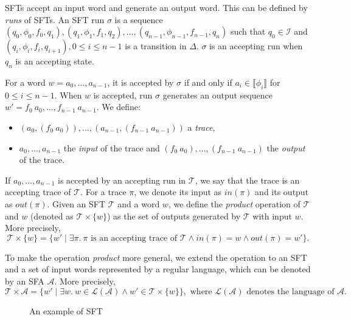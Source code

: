 \documentclass[a4paper,UKenglish,cleveref, autoref, thm-restate]{lipics-v2021}
\begin{document}
SFTs accept an input word and generate an output word. This can be defined by \emph{runs} of SFTs.
An SFT run $\sigma$ is a sequence $(q_0, \phi_0, f_0, q_1),(q_1, \phi_1, f_1, q_2),\ldots, (q_{n-1}, \phi_{n-1}, f_{n-1}, q_n)$ such that $q_0\in \mathcal{I}$ and $(q_i, 
\phi_i, f_i, q_{i+1}), 0 \leq i \leq n-1$ is a transition in $\Delta$.
$\sigma$ is an accepting run when $q_n$ is an accepting state.

For a word $w = a_0,\ldots, a_{n-1}$, it is accepted by $\sigma$ if and only if $a_i \in \llbracket\phi_i \rrbracket$ for $0 \leq i \leq n - 1$. When $w$ is accepted, run $\sigma$ generates an output sequence $w'= f_0~a_0, \ldots, f_{n-1}~a_{n-1}$. We define:
\begin{itemize}
\item  $(a_0,(f_0~a_0)), \ldots, (a_{n-1},(f_{n-1}~a_{n-1}))$ a \emph{trace},
\item $a_0,\ldots,a_{n-1}$ the \emph{input} of the trace and $(f_0~a_0), \ldots, (f_{n-1}~a_{n-1})$ the \emph{output} of the trace.
\end{itemize}

If $a_0,\ldots,a_{n-1}$ is accepted by an accepting run in $\mathcal{T}$, we say that the trace is an accepting trace of $\mathcal{T}$.
For a trace $\pi$, we denote its input as $\mathit{in}(\pi)$ and its output as $\mathit{out}(\pi)$.
%
Given an SFT $\mathcal{T}$ and a word $w$, we define the \emph{product} operation of $\mathcal{T}$ and $w$ (denoted as $\mathcal{T}\times\{w\}$) as the set of outputs generated by $\mathcal{T}$ with input $w$. More precisely, 
\[
\mathcal{T}\times\{w\} = \{w'\mid \exists \pi.~\pi \text{ is an accepting trace of } \mathcal{T} \land in(\pi) = w \land out(\pi) = w'\}.
\]

To make the operation \emph{product} more general, we extend the operation to an SFT and a set of input words represented by a regular language, which can be denoted by an SFA $\mathcal{A}$. More precisely,
\[
\mathcal{T}\times \mathcal{A} = \{w'\mid \exists w.~w\in \mathcal{L}(\mathcal{A})\land w' \in \mathcal{T}\times\{w\}\}, \text{ where }\mathcal{L}(\mathcal{A})\text{ denotes the language of }\mathcal{A}.
\] 

\begin{figure}[hbt!]
  \centering
    \caption{An example of SFT}
    \label{fig-example-ft}
    \end{figure}   
\end{document}
